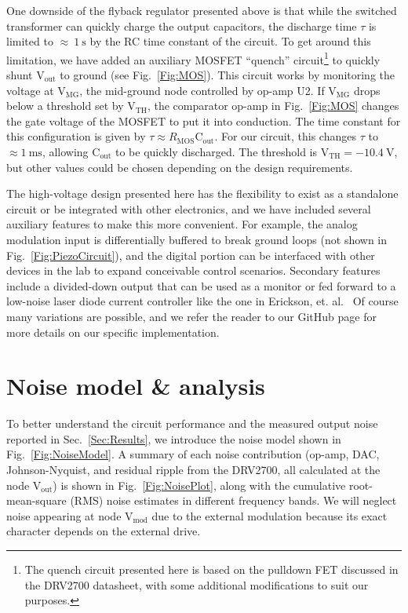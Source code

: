 \documentclass[aip,rsi,reprint]{revtex4-1} %
\begin{document}
One downside of the flyback regulator presented above is that while the switched transformer can quickly charge the output capacitors, the discharge time $\tau$ is limited to {$\approx~\SI{1}{\second}$} by the RC time constant of the circuit.
To get around this limitation, we have added an auxiliary MOSFET ``quench'' circuit\footnote{The quench circuit presented here is based on the pulldown FET discussed in the DRV2700 datasheet, with some additional modifications to suit our purposes.} to quickly shunt $\text{V}_\text{out}$ to ground (see Fig.~\ref{Fig:MOS}).
This circuit works by monitoring the voltage at $\text{V}_\text{MG}$, the mid-ground node controlled by op-amp U2.
If $\text{V}_\text{MG}$ drops below a threshold set by $\text{V}_\text{TH}$, the comparator op-amp in Fig.~\ref{Fig:MOS} changes the gate voltage of the MOSFET to put it into conduction.
The time constant for this configuration is given by $\tau \approx R_\text{MOS}\text{C}_\text{out}$.
For our circuit, this changes $\tau$ to $\approx\SI{1}{\milli\second}$, allowing $\text{C}_\text{out}$ to be quickly discharged.
The threshold is $\text{V}_\text{TH} = \SI{-10.4}{\volt}$, but other values could be chosen depending on the design requirements.

The high-voltage design presented here has the flexibility to exist as a standalone circuit or be integrated with other electronics, and we have included several auxiliary features to make this more convenient.
For example, the analog modulation input is differentially buffered to break ground loops (not shown in Fig.~\ref{Fig:PiezoCircuit}), and the digital portion can be interfaced with other devices in the lab to expand conceivable control scenarios.
Secondary features include a divided-down output that can be used as a monitor or fed forward to a low-noise laser diode current controller like the one in Erickson, et. al.~\cite{Erickson2008a}
Of course many variations are possible, and we refer the reader to our GitHub page for more details on our specific implementation.\cite{PiezoDesignFiles}


\section{Noise model \& analysis}
\label{Sec:NoiseAnalysis}

To better understand the circuit performance and the measured output noise reported in Sec.~\ref{Sec:Results}, we introduce the noise model shown in Fig.~\ref{Fig:NoiseModel}. 
A summary of each noise contribution (op-amp, DAC, Johnson-Nyquist, and residual ripple from the DRV2700, all calculated at the node $\text{V}_\text{out}$) is shown in Fig.~\ref{Fig:NoisePlot}, along with the cumulative root-mean-square (RMS) noise estimates in different frequency bands.
We will neglect noise appearing at node $\text{V}_\text{mod}$ due to the external modulation because its exact character depends on the external drive.
\end{document}
